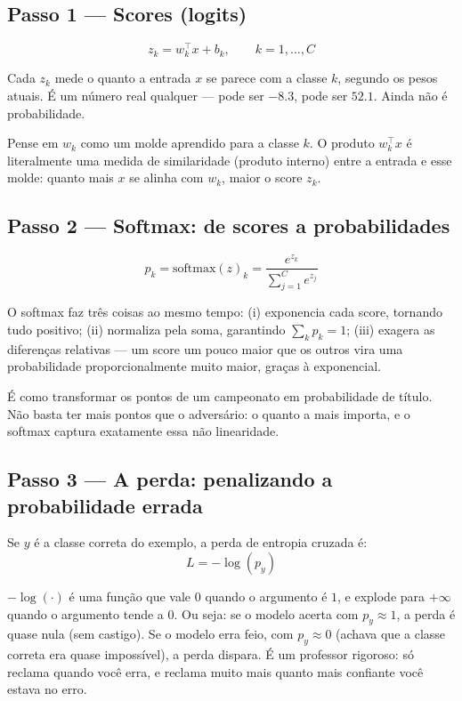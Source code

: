 \documentclass[11pt]{article}
\begin{document}
\subsection*{Passo 1 --- Scores (logits)}
$$
z_k = w_k^\top x + b_k, \qquad k = 1,\dots,C
$$

Cada $z_k$ mede o quanto a entrada $x$ se parece com a classe $k$, segundo os pesos atuais. É um número real qualquer --- pode ser $-8.3$, pode ser $52.1$. Ainda não é probabilidade.

\begin{intuicao}
Pense em $w_k$ como um molde aprendido para a classe $k$. O produto $w_k^\top x$ é literalmente uma medida de similaridade (produto interno) entre a entrada e esse molde: quanto mais $x$ se alinha com $w_k$, maior o score $z_k$.
\end{intuicao}

\subsection*{Passo 2 --- Softmax: de scores a probabilidades}
$$
p_k = \mathrm{softmax}(z)_k = \frac{e^{z_k}}{\sum_{j=1}^{C} e^{z_j}}
$$

O softmax faz três coisas ao mesmo tempo: (i) exponencia cada score, tornando tudo positivo; (ii) normaliza pela soma, garantindo $\sum_k p_k = 1$; (iii) exagera as diferenças relativas --- um score um pouco maior que os outros vira uma probabilidade proporcionalmente muito maior, graças à exponencial.

\begin{intuicao}
É como transformar os pontos de um campeonato em probabilidade de título. Não basta ter mais pontos que o adversário: o quanto a mais importa, e o softmax captura exatamente essa não linearidade.
\end{intuicao}

\subsection*{Passo 3 --- A perda: penalizando a probabilidade errada}

Se $y$ é a classe correta do exemplo, a perda de entropia cruzada é:
$$
L = -\log(p_y)
$$

\begin{intuicao}
$-\log(\cdot)$ é uma função que vale $0$ quando o argumento é $1$, e explode para $+\infty$ quando o argumento tende a $0$. Ou seja: se o modelo acerta com $p_y \approx 1$, a perda é quase nula (sem castigo). Se o modelo erra feio, com $p_y \approx 0$ (achava que a classe correta era quase impossível), a perda dispara. É um professor rigoroso: só reclama quando você erra, e reclama muito mais quanto mais confiante você estava no erro.
\end{intuicao}
\end{document}
